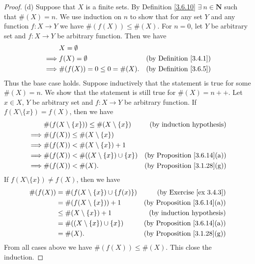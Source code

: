 \begin{proof}{(d)}
    Suppose that \(X\) is a finite sets.
    By Definition \ref{3.6.10} \(\exists\ n \in \mathbf{N}\) such that \(\#(X) = n\).
    We use induction on \(n\) to show that for any set \(Y\) and any function \(f : X \to Y\) we have \(\#(f(X)) \leq \#(X)\).
    For \(n = 0\), let \(Y\) be arbitrary set and \(f : X \to Y\) be arbitrary function.
    Then we have
    \begin{align*}
                 & X = \emptyset                                                     \\
        \implies & f(X) = \emptyset             & \text{(by Definition \ref{3.4.1})} \\
        \implies & \#(f(X)) = 0 \leq 0 = \#(X). & \text{(by Definition \ref{3.6.5})}
    \end{align*}
    Thus the base case holds.
    Suppose inductively that the statement is true for some \(\#(X) = n\).
    We show that the statement is still true for \(\#(X) = n++\).
    Let \(x \in X\), \(Y\) be arbitrary set and \(f : X \to Y\) be arbitrary function.
    If \(f(X \setminus \{x\}) = f(X)\), then we have
    \begin{align*}
                 & \#(f(X \setminus \{x\})) \leq \#(X \setminus \{x\}) & \text{(by induction hypothesis)}        \\
        \implies & \#(f(X)) \leq \#(X \setminus \{x\})                                                           \\
        \implies & \#(f(X)) < \#(X \setminus \{x\}) + 1                                                          \\
        \implies & \#(f(X)) < \#((X \setminus \{x\}) \cup \{x\})       & \text{(by Proposition \ref{3.6.14}(a))} \\
        \implies & \#(f(X)) < \#(X).                                   & \text{(by Proposition \ref{3.1.28}(g))}
    \end{align*}
    If \(f(X \setminus \{x\}) \neq f(X)\), then we have
    \begin{align*}
        \#(f(X)) & = \#(f(X \setminus \{x\}) \cup \{f(x)\}) & \text{(by Exercise \ref{ex 3.4.3})}     \\
                 & = \#(f(X \setminus \{x\})) + 1           & \text{(by Proposition \ref{3.6.14}(a))} \\
                 & \leq \#(X \setminus \{x\}) + 1           & \text{(by induction hypothesis)}        \\
                 & = \#((X \setminus \{x\}) \cup \{x\})     & \text{(by Proposition \ref{3.6.14}(a))} \\
                 & = \#(X).                                 & \text{(by Proposition \ref{3.1.28}(g))}
    \end{align*}
    From all cases above we have \(\#(f(X)) \leq \#(X)\).
    This close the induction.


\end{proof}
